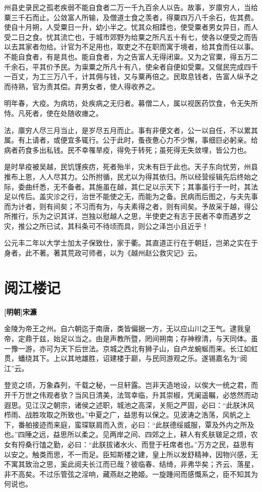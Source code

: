 \documentclass[UTF8,titlepage,oneside]{ctexbook}
\begin{document}
州县史录民之孤老疾弱不能自食者二万一千九百余人以告。故事，岁廪穷人，当给粟三千石而止。公敛富人所输，及僧道士食之羡者，得粟四万八千余石，佐其费。使自十月朔，人受粟日一升，幼小半之。忧其众相蹂也，使受粟者男女异日，而人受二日之食。忧其流亡也，于城市郊野为给粟之所凡五十有七，使各以便受之而告以去其家者勿给。计官为不足用也，取吏之不在职而寓于境者，给其食而任以事。不能自食者，有是具也。能自食者，为之告富人无得闭粜。又为之官粟，得五万二千余石，平其价予民。为粜粟之所凡十有八，使籴者自便如受粟。又僦民完成四千一百丈，为工三万八千，计其佣与钱，又与粟再倍之。民取息钱者，告富人纵予之而待熟，官为责其偿。弃男女者，使人得收养之。


明年春，大疫。为病坊，处疾病之无归者。募僧二人，属以视医药饮食，令无失所恃。凡死者，使在处随收瘗之。


法，廪穷人尽三月当止，是岁尽五月而止。事有非便文者，公一以自任，不以累其属。有上请者，或便宜多辄行。公于此时，蚤夜惫心力不少懈，事细巨必躬亲。给病者药食多出私钱。民不幸罹旱疫，得免于转死；虽死得无失敛埋，皆公力也。


是时旱疫被吴越，民饥馑疾疠，死者殆半，灾未有巨于此也。天子东向忧劳，州县推布上恩，人人尽其力。公所拊循，民尤以为得其依归。所以经营绥辑先后终始之际，委曲纤悉，无不备者。其施虽在越，其仁足以示天下；其事虽行于一时，其法足以传后。盖灾沴之行，治世不能使之无，而能为之备。民病而后图之，与夫先事而为计者，则有间矣；不习而有为，与夫素得之者，则有间矣。予故采于越，得公所推行，乐为之识其详，岂独以慰越人之思，半使吏之有志于民者不幸而遇岁之灾，推公之所已试，其科条可不待顷而具，则公之泽岂小且近乎！


公元丰二年以大学士加太子保致仕，家于衢。其直道正行在于朝廷，岂弟之实在于身者，此不著。著其荒政可师者，以为《越州赵公救灾记》云。



\chapter*{阅江楼记}
\begin{center}
	\textbf{[明朝]宋濂}
\end{center}


金陵为帝王之州。自六朝迄于南唐，类皆偏据一方，无以应山川之王气。逮我皇帝，定鼎于兹，始足以当之。由是声教所暨，罔间朔南；存神穆清，与天同体。虽一豫一游，亦可为天下后世法。京城之西北有狮子山，自卢龙蜿蜒而来。长江如虹贯，蟠绕其下。上以其地雄胜，诏建楼于巅，与民同游观之乐。遂锡嘉名为“阅江”云。


登览之顷，万象森列，千载之秘，一旦轩露。岂非天造地设，以俟大一统之君，而开千万世之伟观者欤？当风日清美，法驾幸临，升其崇椒，凭阑遥瞩，必悠然而动遐思。见江汉之朝宗，诸侯之述职，城池之高深，关阨之严固，必曰：“此朕沐风栉雨、战胜攻取之所致也。”中夏之广，益思有以保之。见波涛之浩荡，风帆之上下，番舶接迹而来庭，蛮琛联肩而入贡，必曰：“此朕德绥威服，覃及外内之所及也。”四陲之远，益思所以柔之。见两岸之间、四郊之上，耕人有炙肤皲足之烦，农女有捋桑行馌之勤，必曰：“此朕拔诸水火、而登于衽席者也。”万方之民，益思有以安之。触类而思，不一而足。臣知斯楼之建，皇上所以发舒精神，因物兴感，无不寓其致治之思，奚此阅夫长江而已哉？彼临春、结绮，非弗华矣；齐云、落星，非不高矣。不过乐管弦之淫响，藏燕赵之艳姬。一旋踵间而感慨系之，臣不知其为何说也。
\end{document}
